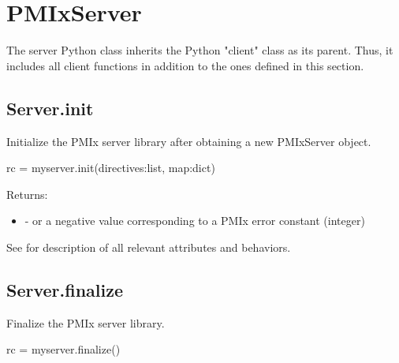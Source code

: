 \section{PMIxServer}
\label{app:python:server}

The server Python class inherits the Python "client" class as its parent. Thus, it includes all client functions in addition to the ones defined in this section.

\subsection{Server.init}

\summary Initialize the \ac{PMIx} server library after obtaining a new PMIxServer object.

\format

\pyspecificstart
\begin{codepar}
rc = myserver.init(directives:list, map:dict)
\end{codepar}
\pyspecificend


\begin{arglist}
\end{arglist}

Returns:

\begin{itemize}
    \item {} -  or a negative value corresponding to a PMIx error constant (integer)
\end{itemize}

See  for description of all relevant attributes and behaviors.


\subsection{Server.finalize}

\summary Finalize the \ac{PMIx} server library.

\format

\pyspecificstart
\begin{codepar}
rc = myserver.finalize()
\end{codepar}
\pyspecificend



